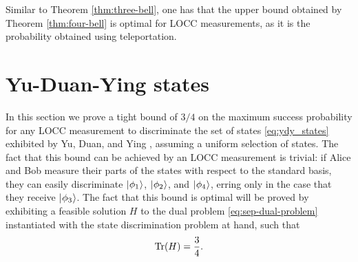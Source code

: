 \begin{remark}
  Similar to Theorem \ref{thm:three-bell}, one has that the upper bound
  obtained by Theorem \ref{thm:four-bell} is optimal for LOCC measurements,
  as it is the probability obtained using teleportation.
\end{remark}



\section{Yu-Duan-Ying states}

In this section we prove a tight bound of $3/4$ on the maximum success
probability for any LOCC measurement to discriminate the set of states 
\eqref{eq:ydy_states} exhibited by Yu, Duan, and Ying \cite{Yu12},
assuming a uniform selection of states.
The fact that this bound can be achieved by an LOCC measurement is trivial:
if Alice and Bob measure their parts of the states with respect to the standard
basis, they can easily discriminate $\lvert\mspace{0.5mu} \phi_1 \mspace{0.5mu} \rangle$, $\lvert\mspace{0.5mu} \phi_2 \mspace{0.5mu} \rangle$, and 
$\lvert\mspace{0.5mu} \phi_4 \mspace{0.5mu} \rangle$, erring only in the case that they receive $\lvert\mspace{0.5mu} \phi_3 \mspace{0.5mu} \rangle$.
The fact that this bound is optimal will be proved by exhibiting a 
feasible solution $H$ to the dual problem \eqref{eq:sep-dual-problem}
instantiated with the state discrimination problem at hand, such that
\begin{equation}
\operatorname{Tr}(H) = \frac{3}{4}.
\end{equation}

